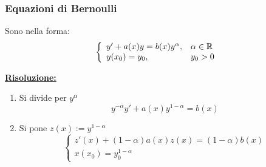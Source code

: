 \subsubsection{Equazioni di Bernoulli}
Sono nella forma:
\begin{equation}
    \left\{
    \begin{array}{l l}
        y' +a(x)y = b(x)y^\alpha, & \alpha \in \mathbb{R} \\
        y(x_0) = y_0, & y_0 > 0 
    \end{array}
    \right.
\end{equation}

\textbf{\underline{Risoluzione: }}
\begin{enumerate}
    \item Si divide per $y^\alpha$ \[ y^{-\alpha}y' + a(x) y^{1-\alpha} = b(x) \]
    \item Si pone $z(x) := y^{1-\alpha}$ 
    \[ \begin{cases}
        z'(x) + (1-\alpha)a(x)z(x) = (1-\alpha)b(x) \\
        x(x_0) = y_0^{1-\alpha}
    \end{cases} \]
\end{enumerate}
